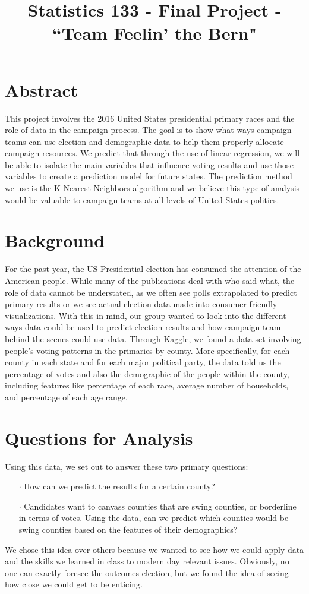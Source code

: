 \documentclass[11pt]{article}
\title{Statistics 133 - Final Project - ``Team Feelin' the Bern"}
\author{\Name}
\date{}
\begin{document}
\maketitle

\section*{Abstract}
This project involves the 2016 United States presidential primary races and the role of data in the campaign process.  The goal is to show what ways campaign teams can use election and demographic data to help them properly allocate campaign resources. We predict that through the use of linear regression, we will be able to isolate the main variables that influence voting results and use those variables to create a prediction model for future states. The prediction method we use is the K Nearest Neighbors algorithm and we believe this type of analysis would be valuable to campaign teams at all levels of United States politics.

\newpage

\section*{Background}
For the past year, the US Presidential election has consumed the attention of the American people. While many of the publications deal with who said what, the role of data cannot be understated, as we often see polls extrapolated to predict primary results or we see actual election data made into consumer friendly visualizations. With this in mind, our group wanted to look into the different ways data could be used to predict election results and how campaign team behind the scenes could use data. Through Kaggle, we found a data set involving people’s voting patterns in the primaries by county. More specifically, for each county in each state and for each major political party, the data told us the percentage of votes and also the demographic of the people within the county, including features like percentage of each race, average number of households, and percentage of each age range. 
\newpage

\section*{Questions for Analysis}
Using this data, we set out to answer these two primary questions:

\begin{enumerate}
	\item[$\cdot$] How can we predict the results for a certain county? 
	\item[$\cdot$] Candidates want to canvass counties that are swing counties, or borderline in terms of votes. Using the data, can we predict which counties would be swing counties based on the features of their demographics?
\end{enumerate}
We chose this idea over others because we wanted to see how we could apply data and the skills we learned in class to modern day relevant issues. Obviously, no one can exactly foresee the outcomes election, but we found the idea of seeing how close we could get to be enticing.
\newpage
\end{document}
